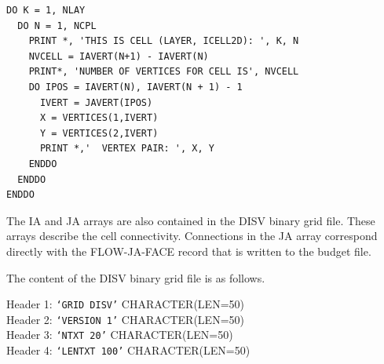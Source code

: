 \begin{verbatim}
DO K = 1, NLAY
  DO N = 1, NCPL
    PRINT *, 'THIS IS CELL (LAYER, ICELL2D): ', K, N
    NVCELL = IAVERT(N+1) - IAVERT(N)
    PRINT*, 'NUMBER OF VERTICES FOR CELL IS', NVCELL
    DO IPOS = IAVERT(N), IAVERT(N + 1) - 1
      IVERT = JAVERT(IPOS)
      X = VERTICES(1,IVERT)
      Y = VERTICES(2,IVERT)
      PRINT *,'  VERTEX PAIR: ', X, Y
    ENDDO
  ENDDO
ENDDO
\end{verbatim}

The IA and JA arrays are also contained in the DISV binary grid file.  These arrays describe the cell connectivity.  Connections in the JA array correspond directly with the FLOW-JA-FACE record that is written to the budget file.

The content of the DISV binary grid file is as follows.

\vspace{5mm}
\noindent Header 1: \texttt{`GRID DISV'}  {\color{red} \footnotesize{CHARACTER(LEN=50)}} \\
\noindent Header 2: \texttt{`VERSION 1'}  {\color{red} \footnotesize{CHARACTER(LEN=50)}} \\
\noindent Header 3: \texttt{`NTXT 20'} {\color{red} \footnotesize{CHARACTER(LEN=50)}}\\
\noindent Header 4: \texttt{`LENTXT 100'} {\color{red} \footnotesize{CHARACTER(LEN=50)}}\\

